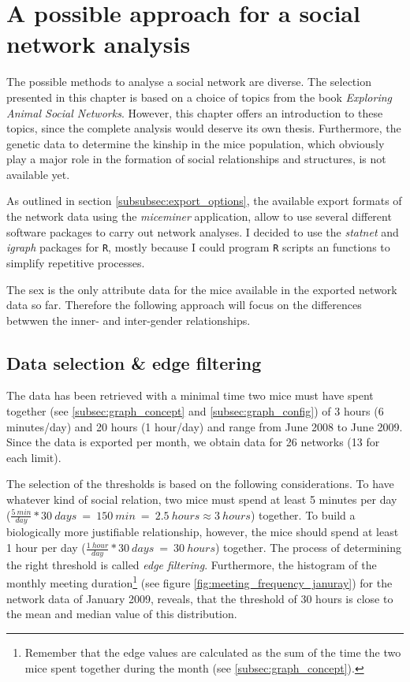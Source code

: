 \section{A possible approach for a social network analysis}
\label{sec:network_analysis}

The possible methods to analyse a social network are diverse. The selection presented in this chapter is based on a choice of topics from the book \textit{Exploring Animal Social Networks}\cite{croft:07}. However, this chapter offers an introduction to these topics, since the complete analysis would deserve its own thesis. Furthermore, the genetic data to determine the kinship in the mice population, which obviously play a major role in the formation of social relationships and structures, is not available yet.  

As outlined in section \ref{subsubsec:export_options}, the available export formats of the network data using the \textit{miceminer} application, allow to use several different software packages to carry out network analyses. I decided to use the \textit{statnet}\cite{statnet:03} and \textit{igraph}\cite{igraph:06} packages for \lstinline|R|\cite{r:05}, mostly because I could program \lstinline|R| scripts an functions to simplify repetitive processes.


The sex is the only attribute data for the mice available in the exported network data so far. Therefore the following approach will focus on the differences betwwen the inner- and inter-gender relationships.

\subsection{Data selection \& edge filtering}
\label{subsec:data_selection}

The data has been retrieved with a minimal time two mice must have spent together (see \ref{subsec:graph_concept} and \ref{subsec:graph_config}) of 3 hours (6 minutes/day) and 20 hours (1 hour/day) and range from June 2008 to June 2009. Since the data is exported per month, we obtain data for 26 networks (13 for each limit).

The selection of the thresholds is based on the following considerations. To have whatever kind of social relation, two mice must spend at least 5 minutes per day ($\frac{5\:min}{day} * 30\:days\:=\:150\:min\:=\:2.5\:hours \approx 3\:hours$) together. To build a biologically more justifiable relationship, however, the mice should spend at least 1 hour per day ($\frac{1\:hour}{day} * 30\:days\:=\:30\:hours$) together. The process of determining the right threshold is called \textit{edge filtering}. Furthermore, the histogram of the monthly meeting duration\footnote{ Remember that the edge values are calculated as the sum of the time the two mice spent together during the month (see \ref{subsec:graph_concept}).} (see figure \ref{fig:meeting_frequency_januray}) for the network data of January 2009, reveals, that the threshold of 30 hours is close to the mean and median value of this distribution.


